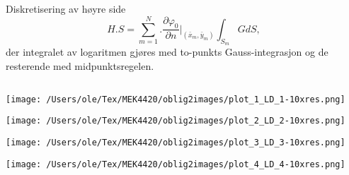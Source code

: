 Diskretisering av høyre side
\begin{equation}
	H.S =   \sum_{m=1}^{N} \Big. \frac{\partial \varphi_0}{\partial n} \Big|_{( \bar{x}_{m} , \bar{y}_{m})} \int_{S_m}  G dS,
\end{equation}
der integralet av logaritmen gjøres med to-punkts Gauss-integrasjon og de resterende med midpunktsregelen.
 
\subsection{}
\noindent
\begin{minipage}[t]{0.45\linewidth}
    \texttt{[image: /Users/ole/Tex/MEK4420/oblig2images/plot\_1\_LD\_1-10xres.png]}
\end{minipage}
\hspace{0.05\linewidth}
\begin{minipage}[t]{0.45\linewidth}
    \texttt{[image: /Users/ole/Tex/MEK4420/oblig2images/plot\_2\_LD\_2-10xres.png]}
\end{minipage}

\vspace{0.5cm} %

\noindent
\begin{minipage}[t]{0.45\linewidth}
    \texttt{[image: /Users/ole/Tex/MEK4420/oblig2images/plot\_3\_LD\_3-10xres.png]}
\end{minipage}
\hspace{0.05\linewidth}
\begin{minipage}[t]{0.45\linewidth}
    \texttt{[image: /Users/ole/Tex/MEK4420/oblig2images/plot\_4\_LD\_4-10xres.png]}
\end{minipage}


